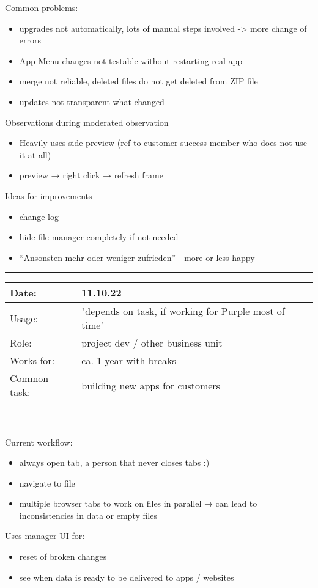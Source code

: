 Common problems:
\begin{itemize}[nosep]  
  \item upgrades not automatically, lots of manual steps involved -> more change of errors
  \item App Menu changes not testable without restarting real app
  \item merge not reliable, deleted files do not get deleted from ZIP file
  \item updates not transparent what changed
\end{itemize}


Observations during moderated observation
\begin{itemize}[nosep]  
  \item Heavily uses side preview (ref to customer success member who does not use it at all)
  \item preview → right click → refresh frame
\end{itemize}

Ideas for improvements
\begin{itemize}[nosep]  
  \item change log
  \item hide file manager completely if not needed
  \item “Ansonsten mehr oder weniger zufrieden” - more or less happy
\end{itemize}
\bigskip
\hrule
\begin{tabularx}{\linewidth}{lX}
  Date: & 11.10.22 \\
  \hline
  Usage: & "depends on task, if working for Purple most of time"\\
  \hline
  Role: & project dev / other business unit \\
  \hline
  Works for: & ca. 1 year with breaks \\
  \hline
  Common task: &  building new apps for customers
\end{tabularx}
\\\\
Current workflow:
\begin{itemize}[nosep]
  \item always open tab, a person that never closes tabs :)
  \item navigate to file
  \item multiple browser tabs to work on files in parallel → can lead to inconsistencies in data or empty files
\end{itemize}
Uses manager UI for:
\begin{itemize}[nosep]
  \item reset of broken changes
  \item see when data is ready to be delivered to apps / websites
\end{itemize}

